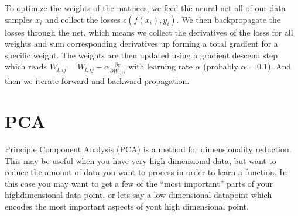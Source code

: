 \documentclass[12pt]{article}
\newcommand{\der}{\partial}
\newcommand{\deriv}[2]{\frac{\der #1}{\der #2}}
\begin{document}
To optimize the weights of the matrices, we feed the neural net all of our data samples $x_i$ and collect the losses $c(f(x_i),y_i)$.
We then backpropagate the losses through the net, which means we collect the derivatives of the losss for all weights and sum corresponding derivatives up forming a total gradient for a specific weight.
The weights are then updated using a gradient descend step which reads $W_{l,ij} = W_{l,ij} - \alpha \deriv{c}{W_{l,ij}}$ with learning rate $\alpha$ (probably $\alpha=0.1$).
And then we iterate forward and backward propagation.


\section{PCA}
Principle Component Analysis (PCA) is a method for dimensionality reduction.
This may be useful when you have very high dimensional data, but want to reduce the amount of data you want to process in order to learn a function.
In this case you may want to get a few of the \enquote{most important} parts of your highdimensional data point, or lets say a low dimensional datapoint which encodes the most important aspects of yout high dimensional point.
\end{document}
